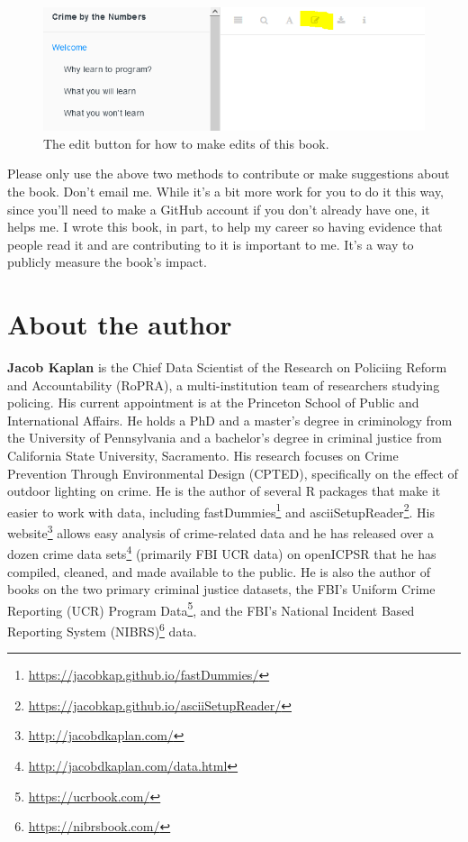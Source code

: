 \documentclass[
]{krantz}
\renewcommand{\href}[2]{#2\footnote{\url{#1}}}
\begin{document}
\begin{figure}

{\centering \includegraphics[width=0.9\linewidth]{images/edit_button} 

}

\caption{The edit button for how to make edits of this book.}\label{fig:unnamed-chunk-2}
\end{figure}

Please only use the above two methods to contribute or make suggestions about the book. Don't email me. While it's a bit more work for you to do it this way, since you'll need to make a GitHub account if you don't already have one, it helps me. I wrote this book, in part, to help my career so having evidence that people read it and are contributing to it is important to me. It's a way to publicly measure the book's impact.

\hypertarget{about-the-author}{%
\chapter*{About the author}\label{about-the-author}}


\textbf{Jacob Kaplan} is the Chief Data Scientist of the Research on Policiing Reform and Accountability (RoPRA), a multi-institution team of researchers studying policing. His current appointment is at the Princeton School of Public and International Affairs. He holds a PhD and a master's degree in criminology from the University of Pennsylvania and a bachelor's degree in criminal justice from California State University, Sacramento. His research focuses on Crime Prevention Through Environmental Design (CPTED), specifically on the effect of outdoor lighting on crime. He is the author of several R packages that make it easier to work with data, including \href{https://jacobkap.github.io/fastDummies/}{fastDummies} and \href{https://jacobkap.github.io/asciiSetupReader/}{asciiSetupReader}. His \href{http://jacobdkaplan.com/}{website} allows easy analysis of crime-related data and he has released over a \href{http://jacobdkaplan.com/data.html}{dozen crime data sets} (primarily FBI UCR data) on openICPSR that he has compiled, cleaned, and made available to the public. He is also the author of books on the two primary criminal justice datasets, the FBI's \href{https://ucrbook.com/}{Uniform Crime Reporting (UCR) Program Data}, and the FBI's \href{https://nibrsbook.com/}{National Incident Based Reporting System (NIBRS)} data.
\end{document}
